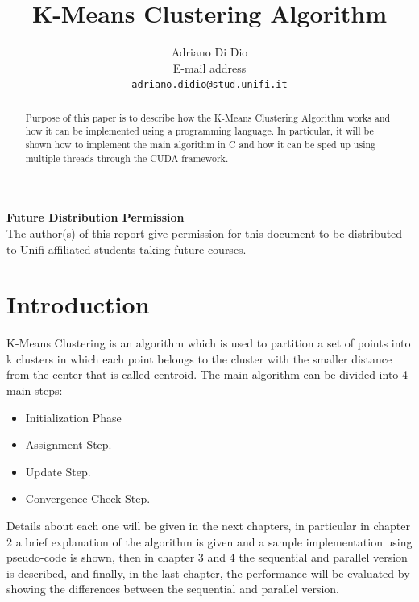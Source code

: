 \documentclass[10pt,twocolumn,letterpaper]{article}
\begin{document}
\title{K-Means Clustering Algorithm}

\author{Adriano Di Dio\\
E-mail address\\
{\tt\small adriano.didio@stud.unifi.it}
}

\maketitle
\thispagestyle{empty}

\begin{abstract}
Purpose of this paper is to describe how the K-Means Clustering Algorithm works and how it can be implemented using a 
programming language.\newline
In particular, it will be shown how to implement the main algorithm in C and how it can be sped up using multiple threads through the 
CUDA framework.
\end{abstract}

\noindent\large\textbf{Future Distribution Permission}\\
\indent The author(s) of this report give permission for this document to be distributed to Unifi-affiliated students taking future courses.

\section{Introduction}
K-Means Clustering is an algorithm which is used to partition a set of points into k clusters in which each point belongs to the cluster
with the smaller distance from the center that is called centroid.\newline
The main algorithm can be divided into 4 main steps:
\begin{itemize}
  \item Initialization Phase
  \item Assignment Step.
  \item Update Step.
  \item Convergence Check Step.
\end{itemize}
Details about each one will be given in the next chapters, in particular in chapter 2 a brief explanation of the algorithm is 
given and a sample implementation using pseudo-code is shown, then in chapter 3 and 4 the sequential and parallel version is 
described, and finally, in the last chapter, the performance will be evaluated by showing the differences between the 
sequential and parallel version.\newline
\end{document}
